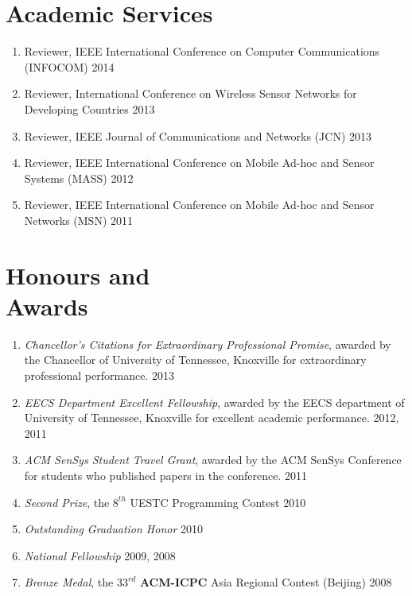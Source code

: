 \documentclass[margin, centered]{resume}
\begin{document}
\begin{resume}
    \section{\mysidestyle Academic Services}
    \begin{enumerate}
    \item Reviewer, IEEE International Conference on Computer Communications (INFOCOM) \hfill 2014
    \item Reviewer, International Conference on Wireless Sensor Networks for Developing Countries \hfill 2013
    \item Reviewer, IEEE Journal of Communications and Networks (JCN) \hfill 2013
    \item Reviewer, IEEE International Conference on Mobile Ad-hoc and Sensor Systems (MASS) \hfill 2012
    \item Reviewer, IEEE International Conference on Mobile Ad-hoc and Sensor Networks (MSN) \hfill 2011
    \end{enumerate}

    \section{\mysidestyle Honours and\\Awards} 
    \begin{enumerate}
    \item \textsl{Chancellor's Citations for Extraordinary Professional Promise}, awarded by the Chancellor of University of Tennessee, Knoxville for extraordinary professional performance. \hfill 2013 
    \item \textsl{EECS Department Excellent Fellowship}, awarded by the EECS department of University of Tennessee, Knoxville for excellent academic performance. \hfill 2012, 2011
    \item \textsl{ACM SenSys Student Travel Grant}, awarded by the ACM SenSys Conference for students who published papers in the conference. \hfill 2011
    \item \textsl{Second Prize}, the $8^{th}$ UESTC Programming Contest \hfill 2010
    \item \textsl{Outstanding Graduation Honor} \hfill 2010
    \item \textsl{National Fellowship} \hfill 2009, 2008
    \item \textsl{Bronze Medal}, the $33^{rd}$ \textbf{ACM-ICPC} Asia Regional Contest (Beijing) \hfill 2008
    \end{enumerate}

\end{resume}
\end{document}
